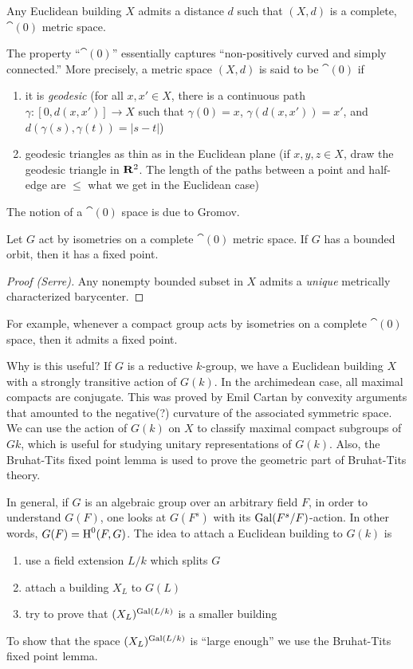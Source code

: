 \begin{theo}
Any Euclidean building $X$ admits a distance $d$ such that $(X,d)$ is a 
complete, $\cat(0)$ metric space. 
\end{theo}

The property ``$\cat(0)$'' essentially captures ``non-positively curved and 
simply connected.'' More precisely, a metric space $(X,d)$ is said to be 
$\cat(0)$ if 
\begin{enumerate}
  \item it is \emph{geodesic} (for all $x,x'\in X$, there is a continuous 
    path $\gamma:[0,d(x,x')] \to X$ such that $\gamma(0)=x$, $\gamma(d(x,x'))=x'$, 
    and $d(\gamma(s),\gamma(t)) = |s-t|$) 
  \item geodesic triangles as thin as in the Euclidean plane (if 
    $x,y,z\in X$, draw the geodesic triangle in $\mathbf{R}^2$. The length of the 
    paths between a point and half-edge are $\leqslant$ what we get in the 
    Euclidean case)
\end{enumerate}

The notion of a $\cat(0)$ space is due to Gromov. 

\begin{lemm}
Let $G$ act by isometries on a complete $\cat(0)$ metric space. If $G$ has a 
bounded orbit, then it has a fixed point. 
\end{lemm}
\begin{proof}[Proof (Serre)]
Any nonempty bounded subset in $X$ admits a \emph{unique} metrically characterized 
barycenter. 
\end{proof}

For example, whenever a compact group acts by isometries on a complete 
$\cat(0)$ space, then it admits a fixed point. 

Why is this useful? If $G$ is a reductive $k$-group, we have a Euclidean building 
$X$ with a strongly transitive action of $G(k)$. In the archimedean case, 
all maximal compacts are conjugate. This was proved by Emil Cartan by convexity 
arguments that amounted to the negative(?) curvature of the associated symmetric 
space. We can use the action of $G(k)$ on $X$ to classify maximal compact 
subgroups of $Gk$, which is useful for studying unitary representations of $G(k)$. 
Also, the Bruhat-Tits fixed point lemma is used to prove the geometric part of 
Bruhat-Tits 
theory. 

In general, if $G$ is an algebraic group over an arbitrary field $F$, in order 
to understand $G(F)$, one looks at $G(F^s)$ with its $\operatorname{Gal}(F^s/F)$-action. 
In other words, $G(F)=\operatorname{H}^0(F,G)$. The idea to attach a Euclidean building to 
$G(k)$ is 
\begin{enumerate}
  \item use a field extension $L/k$ which splits $G$
  \item attach a building $X_L$ to $G(L)$
  \item try to prove that $(X_L)^{\operatorname{Gal}(L/k)}$ is a smaller building
\end{enumerate}
To show that the space $(X_L)^{\operatorname{Gal}(L/k)}$ is ``large enough'' we use the 
Bruhat-Tits fixed point lemma. 

